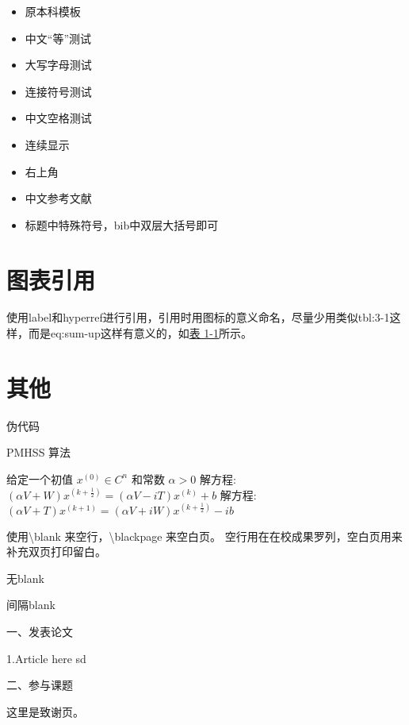 \documentclass[AutoFakeBold]{LZUThesis-PgD&PhD}
\begin{document}
\begin{itemize}
  \item 原本科模板\cite{partl2016}
  \item 中文“等”测试\cite{partl2021}
  \item 大写字母测试\cite{partl2022-2}
  \item 连接符号测试\cite{partl2022-3}
  \item 中文空格测试\cite{partl2022}
  \item 连续显示\cite{partl2021,partl2022-2,partl2022-3}
  \item 右上角\cite{partl2016,partl2021,partl2022-2} 
  \item 中文参考文献 \cite{李刚2006基于动态光谱的脉搏血氧测量精度分析}
  \item 标题中特殊符号，bib中双层大括号即可 \cite{PhysRevLett.108.024101}
\end{itemize}

\section{图表引用}


使用label和hyperref进行引用，引用时用图标的意义命名，尽量少用类似tbl:3-1这样，而是eq:sum-up这样有意义的，如\hyperref[tbl:mole]{表 1-1}所示。

\section{其他}


伪代码

\begin{algorithm}[H]
  \caption{PMHSS 算法\label{Alg:PMHSS}}
  \begin{algorithmic}[1]
    \State 给定一个初值 $ x^{(0)} \in C^{n} $  和常数 $\alpha>0$
    \State 解方程: $(\alpha V+W)x^{(k+\frac{1}{2})}=(\alpha V-i T)x^{(k)}+b $
    \State 解方程: $(\alpha V+T)x^{(k+1)}=(\alpha V+i W)x^{(k+\frac{1}{2})}-i b$
    \EndFor
  \end{algorithmic}
\end{algorithm}

使用\textbackslash blank 来空行，\textbackslash blackpage 来空白页。
空行用在在校成果罗列，空白页用来补充双页打印留白。

无blank

\blank

间隔blank
\blankpage




\backmatter


\printbib



\Achievements
一、发表论文

1.Article here sd

\blank

二、参与课题




\Thanks

这里是致谢页。
\end{document}
